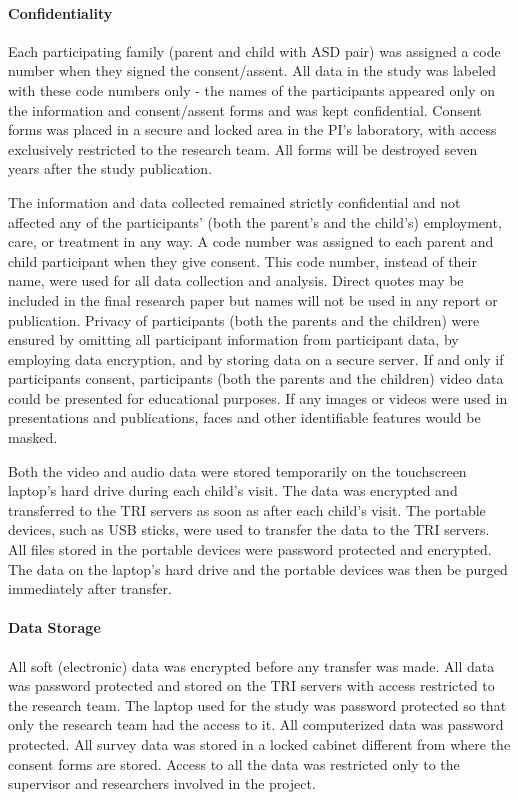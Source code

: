 \paragraph{Confidentiality}
Each participating family (parent and child with ASD pair) was assigned a code number when they signed the consent/assent. All data in the study was labeled with these code numbers only - the names of the participants appeared only on the information and consent/assent forms and was kept confidential. Consent forms was placed in a secure and locked area in the PI's laboratory, with access exclusively restricted to the research team. All forms will be destroyed seven years after the study publication. 

The information and data collected remained strictly confidential and not affected any of the participants' (both the parent's and the child's) employment, care, or treatment in any way. A code number was assigned to each parent and child participant when they give consent. This code number, instead of their name, were used for all data collection and analysis. Direct quotes may be included in the final research paper but names will not be used in any report or publication. Privacy of participants (both the parents and the children) were ensured by omitting all participant information from participant data, by employing data encryption, and by storing data on a secure server.  If and only if participants consent, participants (both the parents and the children) video data could be presented for educational purposes.  If any images or videos were used in presentations and publications, faces and other identifiable features would be masked.

Both the video and audio data were stored temporarily on the touchscreen laptop's hard drive during each child's visit. The data was encrypted and transferred to the TRI servers as soon as after each child's visit. The portable devices, such as USB sticks, were used to transfer the data to the TRI servers. All files stored in the portable devices were password protected and encrypted. The data on the laptop's hard drive and the portable devices was then be purged immediately after transfer. 

\paragraph{Data Storage}
All soft (electronic) data was encrypted before any transfer was made. All data was password protected and stored on the TRI servers with access restricted to the research team. The laptop used for the study was password protected so that only the research team had the access to it. All computerized data was password protected. All survey data was stored in a locked cabinet different from where the consent forms are stored. Access to all the data was restricted only to the supervisor and researchers involved in the project. 


